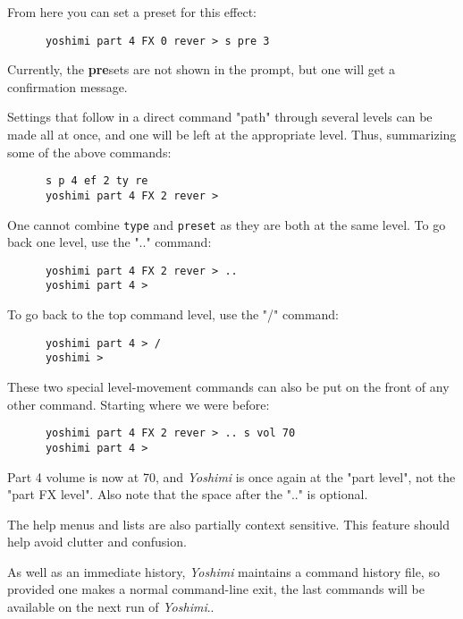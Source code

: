    From here you can set a preset for this effect:

   \begin{verbatim}
      yoshimi part 4 FX 0 rever > s pre 3
   \end{verbatim}

   Currently, the \textbf{pre}sets are not shown in the prompt, but one
   will get a confirmation message.

   Settings that follow in a direct command "path" through several levels
   can be made all at once, and one will be left at the appropriate level.
   Thus, summarizing some of the above commands:

   \begin{verbatim}
      s p 4 ef 2 ty re
      yoshimi part 4 FX 2 rever >
   \end{verbatim}

   One cannot combine \texttt{type} and \texttt{preset} as they
   are both at the same level.  To go back one level, use the
   ".." command:

   \begin{verbatim}
      yoshimi part 4 FX 2 rever > ..
      yoshimi part 4 >
   \end{verbatim}

   To go back to the top command level, use the "/" command:

   \begin{verbatim}
      yoshimi part 4 > /
      yoshimi >
   \end{verbatim}

   These two special level-movement commands can also be put on the front of
   any other command.  Starting where we were before:

   \begin{verbatim}
      yoshimi part 4 FX 2 rever > .. s vol 70
      yoshimi part 4 >
   \end{verbatim}

   Part 4 volume is now at 70, and \textsl{Yoshimi} is once again at the
   "part level", not the "part FX level".  Also note that the space after
   the ".." is optional.

   The help menus and lists are also partially context sensitive. This
   feature should help avoid clutter and confusion.

   As well as an immediate history, \textsl{Yoshimi} maintains a command
   history file, so provided one makes a normal command-line exit, the last
   commands will be available on the next run of \textsl{Yoshimi}..

